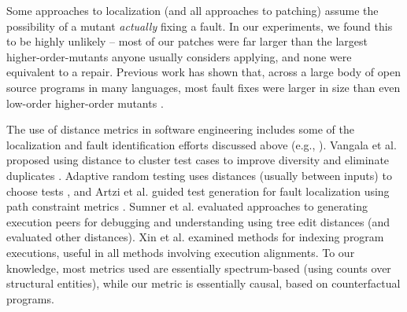 Some approaches to localization (and all approaches to patching) assume the possibility of a mutant \emph{actually} fixing a fault.  In our experiments, we found this to be highly unlikely -- most of our patches were far larger than the largest higher-order-mutants \cite{jia2009higher} anyone usually considers applying, and none were equivalent to a repair.  Previous work has shown that, across a large body of open source programs in many languages, most fault fixes were larger in size than even low-order higher-order mutants \cite{GopinathMutants}.

The use of distance metrics in software engineering includes some of the localization and fault identification efforts discussed above (e.g., \cite{NearNeighbor,GroceError,ChakiLev,Liu06}).  Vangala et al. proposed using distance to cluster test cases to improve diversity and eliminate duplicates \cite{VangalaDist}.  Adaptive random testing uses distances (usually between inputs) to choose tests \cite{Chen,ARTChen,ISSTAART}, and Artzi et al. guided test generation for fault localization using path constraint metrics \cite{ArtziDirected}.  Sumner et al. evaluated approaches to generating execution peers for debugging and understanding \cite{Sumner2011} using tree edit distances (and evaluated other distances).  Xin et al. \cite{Xin2008} examined methods for indexing program executions, useful in all methods involving execution alignments.  To our knowledge, most metrics used are essentially spectrum-based \cite{RepsSpectra,BallConcept} (using counts over structural entities), while our metric is essentially causal, based on counterfactual \cite{LewisCause,LewisCount} programs.